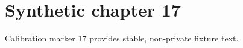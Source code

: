 \chapter{Synthetic chapter 17}\label{chap:17}
Calibration marker 17 provides stable, non-private fixture text.

